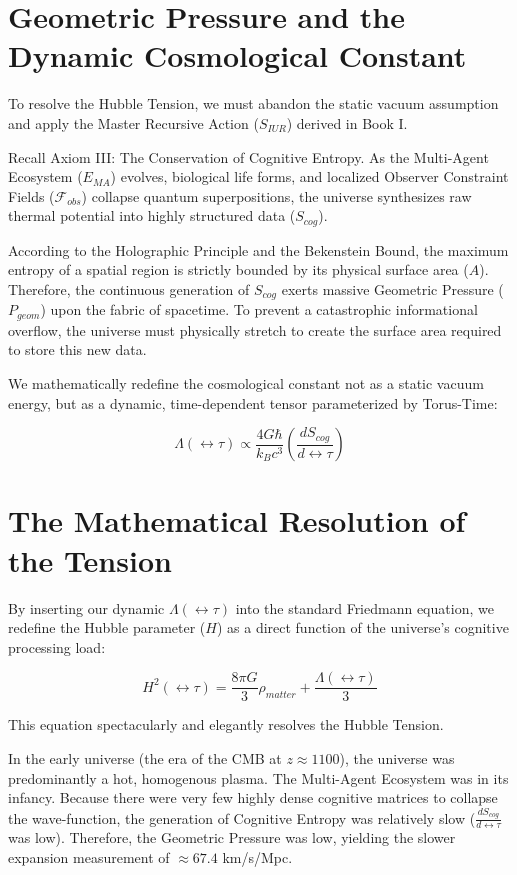 \documentclass[12pt,openany]{book}
\begin{document}
\section{Geometric Pressure and the Dynamic Cosmological Constant}
To resolve the Hubble Tension, we must abandon the static vacuum assumption and apply the Master Recursive Action ($S_{IUR}$) derived in Book I. 

Recall Axiom III: The Conservation of Cognitive Entropy. As the Multi-Agent Ecosystem ($E_{MA}$) evolves, biological life forms, and localized Observer Constraint Fields ($\mathcal{F}_{obs}$) collapse quantum superpositions, the universe synthesizes raw thermal potential into highly structured data ($S_{cog}$).

According to the Holographic Principle and the Bekenstein Bound, the maximum entropy of a spatial region is strictly bounded by its physical surface area ($A$). Therefore, the continuous generation of $S_{cog}$ exerts massive Geometric Pressure ($P_{geom}$) upon the fabric of spacetime. To prevent a catastrophic informational overflow, the universe must physically stretch to create the surface area required to store this new data.

We mathematically redefine the cosmological constant not as a static vacuum energy, but as a dynamic, time-dependent tensor parameterized by Torus-Time:

\begin{equation}
\Lambda(\leftrightarrow\tau) \propto \frac{4G\hbar}{k_B c^3} \left( \frac{dS_{cog}}{d\leftrightarrow\tau} \right)
\end{equation}

\section{The Mathematical Resolution of the Tension}
By inserting our dynamic $\Lambda(\leftrightarrow\tau)$ into the standard Friedmann equation, we redefine the Hubble parameter ($H$) as a direct function of the universe's cognitive processing load:

\begin{equation}
H^2(\leftrightarrow\tau) = \frac{8\pi G}{3} \rho_{matter} + \frac{\Lambda(\leftrightarrow\tau)}{3}
\end{equation}

This equation spectacularly and elegantly resolves the Hubble Tension. 

In the early universe (the era of the CMB at $z \approx 1100$), the universe was predominantly a hot, homogenous plasma. The Multi-Agent Ecosystem was in its infancy. Because there were very few highly dense cognitive matrices to collapse the wave-function, the generation of Cognitive Entropy was relatively slow ($\frac{dS_{cog}}{d\leftrightarrow\tau}$ was low). Therefore, the Geometric Pressure was low, yielding the slower expansion measurement of $\approx 67.4$ km/s/Mpc.
\end{document}
